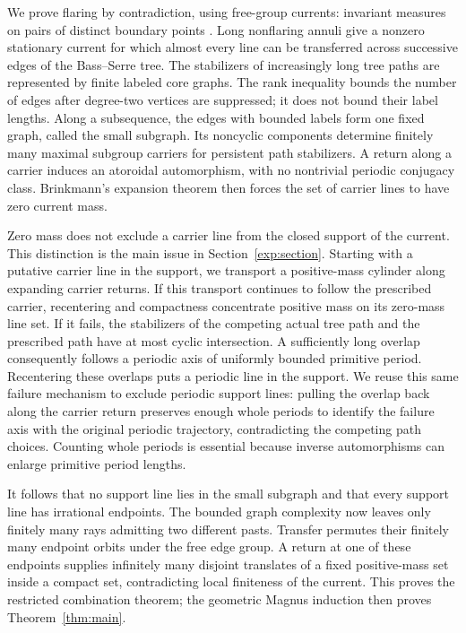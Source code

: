 We prove flaring by contradiction, using free-group currents:
invariant measures on pairs of distinct boundary points
\cite{KapovichCurrents2006}.
Long nonflaring annuli give a nonzero stationary current for which
almost every line can be transferred across successive edges of the
Bass--Serre tree.
The stabilizers of increasingly long tree paths are represented by
finite labeled core graphs. The rank inequality bounds the number of
edges after degree-two vertices are suppressed; it does not bound
their label lengths. Along a subsequence, the edges with bounded
labels form one fixed graph, called the small subgraph. Its noncyclic
components determine finitely many maximal subgroup carriers for
persistent path stabilizers. A return along a carrier induces an
atoroidal automorphism, with no nontrivial periodic conjugacy class.
Brinkmann's expansion theorem then forces the set of carrier lines
to have zero current mass.

Zero mass does not exclude a carrier line from the closed support of
the current. This distinction is the main issue in
Section~\ref{exp:section}. Starting with a putative carrier line in
the support, we transport a positive-mass cylinder along expanding
carrier returns.
If this transport continues to follow the prescribed carrier,
recentering and compactness concentrate positive mass on its
zero-mass line set. If it fails, the stabilizers of the competing
actual tree path and the prescribed path have at most cyclic
intersection. A sufficiently long overlap consequently follows a
periodic axis of uniformly bounded primitive period.
Recentering these overlaps puts a periodic line in the support.
We reuse this same failure mechanism to exclude periodic support
lines: pulling the overlap back along the carrier return preserves
enough whole periods to identify the failure axis with the original
periodic trajectory, contradicting the competing path choices.
Counting whole periods is essential because inverse automorphisms
can enlarge primitive period lengths.

It follows that no support line lies in the small subgraph and that
every support line has irrational endpoints. The bounded graph
complexity now leaves only finitely many rays admitting two
different pasts. Transfer permutes their finitely many endpoint
orbits under the free edge group. A return at one of these endpoints
supplies infinitely many disjoint translates of a fixed positive-mass
set inside a compact set,
contradicting local finiteness of the current. This proves the
restricted combination theorem; the geometric Magnus induction
then proves Theorem~\ref{thm:main}.

